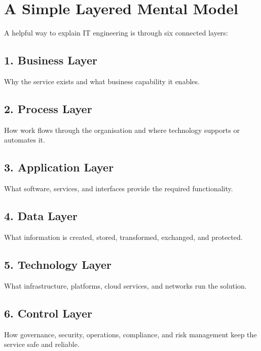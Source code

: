 \documentclass[
  british,
  letterpaper,
  DIV=11,
  numbers=noendperiod]{scrartcl}
\begin{document}
\section{A Simple Layered Mental
Model}\label{a-simple-layered-mental-model}

A helpful way to explain IT engineering is through six connected layers:

\subsection{1. Business Layer}\label{business-layer}

Why the service exists and what business capability it enables.

\subsection{2. Process Layer}\label{process-layer}

How work flows through the organisation and where technology supports or
automates it.

\subsection{3. Application Layer}\label{application-layer}

What software, services, and interfaces provide the required
functionality.

\subsection{4. Data Layer}\label{data-layer}

What information is created, stored, transformed, exchanged, and
protected.

\subsection{5. Technology Layer}\label{technology-layer}

What infrastructure, platforms, cloud services, and networks run the
solution.

\subsection{6. Control Layer}\label{control-layer}

How governance, security, operations, compliance, and risk management
keep the service safe and reliable.
\end{document}
